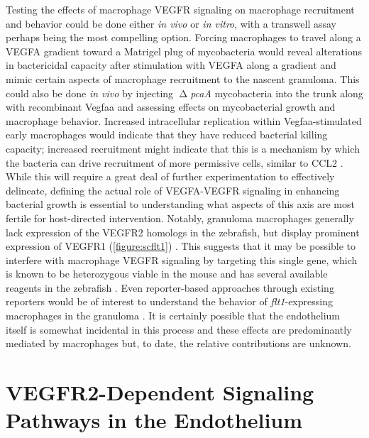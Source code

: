 Testing the effects of macrophage VEGFR signaling on macrophage recruitment and behavior could be done either \textit{in vivo} or \textit{in vitro}, with a transwell assay perhaps being the most compelling option. Forcing macrophages to travel along a VEGFA gradient toward a Matrigel plug of mycobacteria would reveal alterations in bactericidal capacity after stimulation with VEGFA along a gradient and mimic certain aspects of macrophage recruitment to the nascent granuloma. This could also be done \textit{in vivo} by injecting $\upDelta$\textit{pcaA} mycobacteria into the trunk along with recombinant Vegfaa and assessing effects on mycobacterial growth and macrophage behavior. Increased intracellular replication within Vegfaa\hyp{}stimulated early macrophages would indicate that they have reduced bacterial killing capacity; increased recruitment might indicate that this is a mechanism by which the bacteria can drive recruitment of more permissive cells, similar to CCL2 \citep{Cambier2014b, Cattin2015}. While this will require a great deal of further experimentation to effectively delineate, defining the actual role of VEGFA\hyp{}VEGFR signaling in enhancing bacterial growth is essential to understanding what aspects of this axis are most fertile for host\hyp{}directed intervention. Notably, granuloma macrophages generally lack expression of the VEGFR2 homologs in the zebrafish, but display prominent expression of VEGFR1 (\autoref{figure:scflt1}) \citep{Cronan2021}. This suggests that it may be possible to interfere with macrophage VEGFR signaling by targeting this single gene, which is known to be heterozygous viable in the mouse and has several available reagents in the zebrafish \citep{Habeck2002, Thirunavukkarasu2007, Krueger2011, Ho2015, Rossi2016, Wild2017}. Even reporter\hyp{}based approaches through existing reporters would be of interest to understand the behavior of \textit{flt1}\hyp{}expressing macrophages in the granuloma \citep{Krueger2011}. It is certainly possible that the endothelium itself is somewhat incidental in this process and these effects are predominantly mediated by macrophages but, to date, the relative contributions are unknown. 

\section{VEGFR2\hyp{}Dependent Signaling Pathways in the Endothelium}

